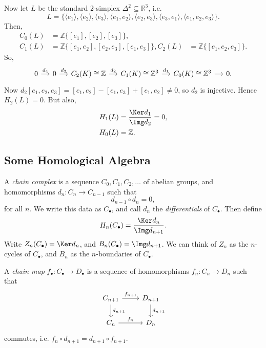 \documentclass[12pt]{article}
\begin{document}
\begin{exbox}
	Now let $L$ be the standard $2$-simplex $\Delta^2 \subseteq \mathbb{R}^3$, i.e.
	\[
		L = \{\langle e_1 \rangle , \langle e_2 \rangle , \langle e_3 \rangle, \langle e_1, e_2 \rangle, \langle e_2, e_3\rangle, \langle e_3, e_1\rangle, \langle e_1, e_2, e_3 \rangle\}.
	\]
	Then,
	\begin{align*}
		C_0(L) &= \mathbb{Z}\{[e_1], [e_2], [e_3]\}, \\
		C_1(L) &= \mathbb{Z}\{[e_1, e_2], [e_2, e_3], [e_1, e_3]\},
		C_2(L) &= \mathbb{Z}\{[e_1, e_2, e_3]\}.
	\end{align*}
	So,
	\[
	\begin{tikzcd}[column sep = small]
		0 \arrow[r, "d_4"] & 0 \arrow[r, "d_3"] & C_2(K) \cong \mathbb{Z} \arrow[r, "d_2"] & C_1(K) \cong \mathbb{Z}^3 \arrow[r, "d_1"] & C_0(K) \cong \mathbb{Z}^3 \arrow[r] & 0.
	\end{tikzcd}
	\]
	Now $d_2[e_1, e_2, e_3] = [e_1, e_2] - [e_1, e_3] + [e_1, e_2] \neq 0$, so $d_2$ is injective. Hence $H_2(L) = 0$. But also,
	\begin{align*}
		H_1(L) &= \frac{\Ker d_1}{\Img d_2} = 0, \\
		H_0(L) &= \mathbb{Z}.
	\end{align*}
\end{exbox}

\subsection{Some Homological Algebra}
\label{sub:hom_alg}

\begin{definition}
	A \emph{chain complex} is a sequence $C_0, C_1, C_2, \ldots$ of abelian groups, and homomorphisms $d_n : C_n \to C_{n-1}$ such that
	\[
	d_{n-1} \circ d_n = 0,
	\]
	for all $n$. We write this data as $C_\bullet$, and call $d_n$ the \emph{differentials} of $C_\bullet$. Then define
	\[
	H_n(C_\bullet) = \frac{\Ker d_n}{\Img d_{n+1}}.
	\]
	Write $Z_n(C_\bullet) = \Ker d_n$, and $B_n(C_\bullet) = \Img d_{n+1}$. We can think of $Z_n$ as the $n$-cycles of $C_\bullet$, and $B_n$ as the $n$-boundaries of $C_\bullet$.

	A \emph{chain map} $f_\bullet : C_\bullet \to D_\bullet$ is a sequence of homomorphisms $f_n : C_n \to D_n$ such that
	\[
	\begin{tikzcd}
		C_{n+1} \arrow[r, "f_{n+1}"] \arrow[d, "d_{n+1}"] & D_{n+1} \arrow[d, "d_{n+1}"] \\
		C_n \arrow[r, "f_n"] & D_n
	\end{tikzcd}
	\]
	commutes, i.e. $f_n \circ d_{n+1} = d_{n+1} \circ f_{n+1}$.
\end{definition}
\end{document}
